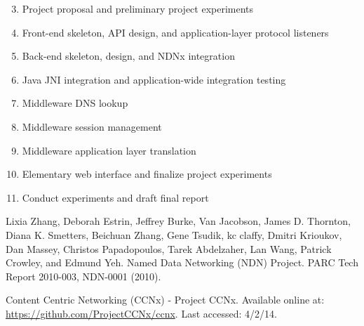 \documentclass[10pt]{article}
\begin{document}
\begin{enumerate}[{\bf Week} 1:]
	\setcounter{enumi}{2}
	\item Project proposal and preliminary project experiments
	\item Front-end skeleton, API design, and application-layer protocol listeners
	\item Back-end skeleton, design, and NDNx integration
	\item Java JNI integration and application-wide integration testing
	\item Middleware DNS lookup
	\item Middleware session management
	\item Middleware application layer translation
	\item Elementary web interface and finalize project experiments
	\item Conduct experiments and draft final report 
\end{enumerate}


\begin{thebibliography}{[MT1]}

 Lixia Zhang, Deborah Estrin, Jeffrey Burke, Van Jacobson, James D. Thornton, Diana K. Smetters, Beichuan Zhang, Gene Tsudik, kc claffy, Dmitri Krioukov, Dan Massey, Christos Papadopoulos, Tarek Abdelzaher, Lan Wang, Patrick Crowley, and Edmund Yeh. Named Data Networking (NDN) Project. PARC Tech Report 2010-003, NDN-0001 (2010).

 Content Centric Networking (CCNx) - Project CCNx. Available online at: \url{https://github.com/ProjectCCNx/ccnx}. Last accessed: 4/2/14.

\end{thebibliography}
\end{document}
